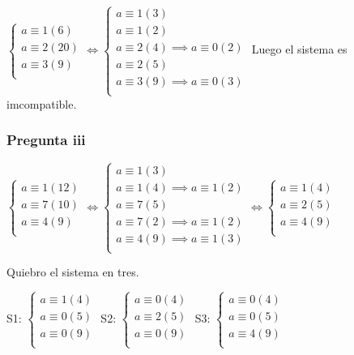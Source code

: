 $ \begin{cases}
    a\equiv 1(6) \\
    a\equiv 2(20) \\
    a\equiv 3(9) \\
\end{cases} 
\iff \begin{cases}
    a\equiv 1(3) \\
    a\equiv 1(2) \\
    a\equiv 2(4) \implies a\equiv 0(2) \\
    a\equiv 2(5) \\
    a\equiv 3(9) \implies a\equiv 0(3) \\
\end{cases} $
Luego el sistema es imcompatible.

\subsubsection{Pregunta iii}
$ \begin{cases}
    a\equiv 1(12) \\
    a\equiv 7(10) \\
    a\equiv 4(9) \\
\end{cases} 
\iff \begin{cases}
    a\equiv 1(3) \\
    a\equiv 1(4) \implies a \equiv 1(2) \\
    a\equiv 7(5) \\
    a\equiv 7(2) \implies a \equiv 1(2) \\
    a\equiv 4(9) \implies a \equiv 1(3) \\
\end{cases}
\iff \begin{cases}
    a\equiv 1(4) \\
    a\equiv 2(5) \\
    a\equiv 4(9) \\
\end{cases} $

Quiebro el sistema en tres.

S1: $ \begin{cases}
    a\equiv 1(4) \\
    a\equiv 0(5) \\
    a\equiv 0(9) \\
\end{cases} $
S2: $ \begin{cases}
    a\equiv 0(4) \\
    a\equiv 2(5) \\
    a\equiv 0(9) \\
\end{cases} $
S3: $ \begin{cases}
    a\equiv 0(4) \\
    a\equiv 0(5) \\
    a\equiv 4(9) \\
\end{cases} $

